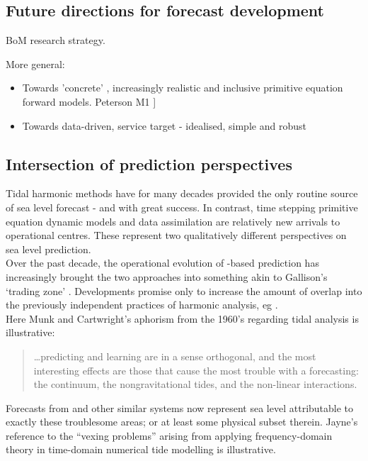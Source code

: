 \subsection{Future directions for forecast development}

BoM research strategy.


More general:

\begin{itemize}
  \item Towards 'concrete' , increasingly realistic and inclusive primitive equation forward models.
Peterson M1 ]\citep{Petersen:2012tr}
 \item Towards data-driven, service target - idealised, simple and robust 
\end{itemize}

\subsection{Intersection of prediction perspectives}
\label{S:two_perspectives}

Tidal harmonic methods have for many decades provided the only routine source of sea level forecast - and with great success.  
In contrast, time stepping primitive equation dynamic models and data assimilation are relatively new arrivals to operational centres.  
These represent two qualitatively different perspectives on sea level prediction.\\


Over the past decade, the operational evolution of \OGCM-based prediction has increasingly brought the two approaches into something akin to Gallison's `trading zone' \citep{Galison:1996uc}.
Developments promise only to increase the amount of overlap into the previously independent practices of harmonic analysis, eg \cite{Arbic:2010us}.\\
Here Munk and Cartwright's aphorism from the 1960's regarding tidal analysis is illustrative:
\begin{quote}
  \dots predicting and learning are in a sense orthogonal, and the most interesting effects are those that cause the most trouble with a forecasting: the continuum, the nongravitational tides, and the non-linear interactions.\citep{Munk:1966ts} 
\end{quote}
Forecasts from \BL{} and other similar systems now represent sea level attributable to exactly these troublesome areas; or at least some physical subset therein.
Jayne's reference to the ``vexing problems'' \citep[pp812]{Jayne:2001tr} arising from applying frequency-domain theory in time-domain numerical tide modelling is illustrative.

